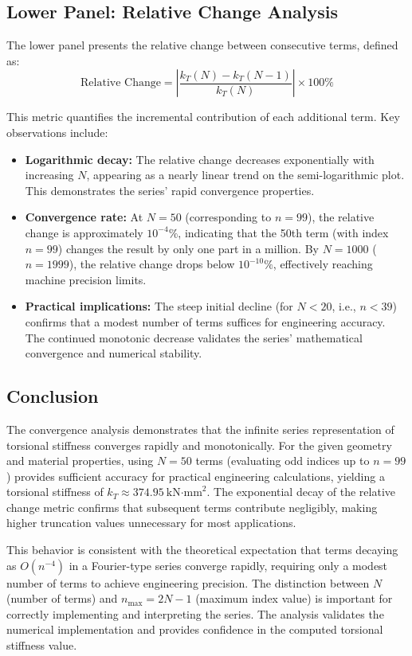 \subsection*{Lower Panel: Relative Change Analysis}

The lower panel presents the relative change between consecutive terms, defined as:
\begin{equation}
    \text{Relative Change} = \left| \frac{k_T(N) - k_T(N-1)}{k_T(N)} \right| \times 100\%
\end{equation}

This metric quantifies the incremental contribution of each additional term. Key observations include:

\begin{itemize}
    \item \textbf{Logarithmic decay:} The relative change decreases exponentially with increasing $N$, appearing as a nearly linear trend on the semi-logarithmic plot. This demonstrates the series' rapid convergence properties.
    
    \item \textbf{Convergence rate:} At $N = 50$ (corresponding to $n = 99$), the relative change is approximately $10^{-4}\%$, indicating that the 50th term (with index $n=99$) changes the result by only one part in a million. By $N = 1000$ ($n = 1999$), the relative change drops below $10^{-10}\%$, effectively reaching machine precision limits.
    
    \item \textbf{Practical implications:} The steep initial decline (for $N < 20$, i.e., $n < 39$) confirms that a modest number of terms suffices for engineering accuracy. The continued monotonic decrease validates the series' mathematical convergence and numerical stability.
\end{itemize}

\subsection*{Conclusion}

The convergence analysis demonstrates that the infinite series representation of torsional stiffness converges rapidly and monotonically. For the given geometry and material properties, using $N = 50$ terms (evaluating odd indices up to $n = 99$) provides sufficient accuracy for practical engineering calculations, yielding a torsional stiffness of $k_T \approx 374.95~\text{kN·mm}^2$. The exponential decay of the relative change metric confirms that subsequent terms contribute negligibly, making higher truncation values unnecessary for most applications.

This behavior is consistent with the theoretical expectation that terms decaying as $O(n^{-4})$ in a Fourier-type series converge rapidly, requiring only a modest number of terms to achieve engineering precision. The distinction between $N$ (number of terms) and $n_{\text{max}} = 2N-1$ (maximum index value) is important for correctly implementing and interpreting the series. The analysis validates the numerical implementation and provides confidence in the computed torsional stiffness value.

